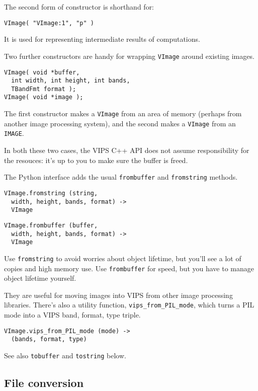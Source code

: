 The second form of constructor is shorthand for:

\begin{verbatim}
VImage( "VImage:1", "p" )
\end{verbatim}

\noindent
It is used for representing intermediate results of computations.

Two further constructors are handy for wrapping \verb+VImage+ around existing
images.

\begin{verbatim}
VImage( void *buffer, 
  int width, int height, int bands, 
  TBandFmt format );
VImage( void *image );
\end{verbatim}

\noindent
The first constructor makes a \verb+VImage+ from an area of memory (perhaps
from another image processing system), and the second makes a \verb+VImage+
from an \verb+IMAGE+. 

In both these two cases, the VIPS C++ API does not assume responsibility
for the resouces: it's up to you to make sure the buffer is freed.

The Python interface adds the usual \verb+frombuffer+ and
\verb+fromstring+ methods. 

\begin{verbatim}
VImage.fromstring (string, 
  width, height, bands, format) -> 
  VImage
\end{verbatim}

\begin{verbatim}
VImage.frombuffer (buffer, 
  width, height, bands, format) -> 
  VImage
\end{verbatim}

\noindent
Use \verb+fromstring+ to avoid worries about object lifetime, but you'll see a
lot of copies and high memory use. Use \verb+frombuffer+ for speed, but you
have to manage object lifetime yourself.

They are useful for moving images into VIPS from other image processing
libraries. There's also a utility function, \verb+vips_from_PIL_mode+, which
turns a PIL mode into a VIPS band, format, type triple.

\begin{verbatim}
VImage.vips_from_PIL_mode (mode) -> 
  (bands, format, type) 
\end{verbatim}

See also \verb+tobuffer+ and \verb+tostring+ below.

\subsection{File conversion}

